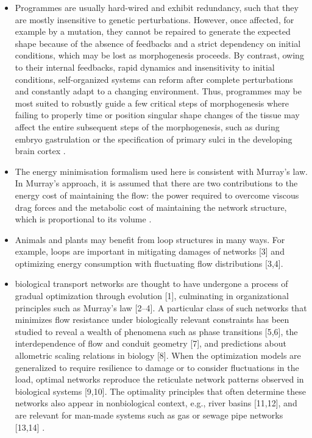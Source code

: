 \begin{itemize}
	\item Programmes are usually hard-wired and exhibit redundancy, such that they are mostly insensitive to genetic perturbations. However, once affected, for example by a mutation, they cannot be repaired to generate the expected shape because of the absence of feedbacks and a strict dependency on initial conditions, which may be lost as morphogenesis proceeds. By contrast, owing to their internal feedbacks, rapid dynamics and insensitivity to initial conditions, self-organized systems can reform after complete perturbations and constantly adapt to a changing environment. Thus, programmes may be most suited to robustly guide a few critical steps of morphogenesis where failing to properly time or position singular shape changes of the tissue may affect the entire subsequent steps of the morphogenesis, such as during embryo gastrulation or the specification of primary sulci in the developing brain cortex \cite{Collinet2021}.
	\item The energy minimisation formalism used here is consistent with Murray’s law. In Murray’s approach, it is assumed that there are two contributions to the energy cost of maintaining the flow: the power required to overcome viscous drag forces and the metabolic cost of maintaining the network structure, which is proportional to its volume \cite{Almeida2022}.
	\item Animals and plants may benefit from loop structures in many ways. For example, loops are important in mitigating damages of networks [3] and optimizing energy consumption with fluctuating flow distributions [3,4]\cite{Hu2013}.
	\item biological transport networks are thought to have undergone a process of gradual optimization through evolution [1], culminating in organizational principles such as Murray’s law [2–4]. A particular class of such networks that minimizes flow resistance under biologically relevant constraints has been studied to reveal a wealth of phenomena such as phase transitions [5,6], the interdependence of flow and conduit geometry [7], and predictions about allometric scaling relations in biology [8]. When the optimization models are generalized to require resilience to damage or to consider fluctuations in the load, optimal networks reproduce the reticulate network patterns observed in biological systems [9,10]. The optimality principles that often determine these networks also appear in nonbiological context, e.g., river basins [11,12], and are relevant for man-made systems such as gas or sewage pipe networks [13,14] \cite{Ronellenfitsch2016}.

\end{itemize}
